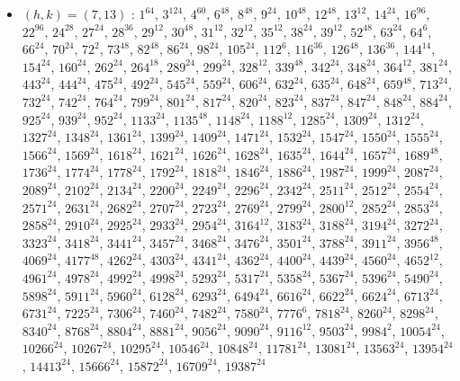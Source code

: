 \begin{itemize}
\item $(h,k)=(7,13)$ : $1^{64}$, $3^{124}$, $4^{60}$, $6^{48}$, $8^{48}$, $9^{24}$, $10^{48}$, $12^{48}$, $13^{12}$, $14^{24}$, $16^{96}$, $22^{96}$, $24^{28}$, $27^{24}$, $28^{36}$, $29^{12}$, $30^{48}$, $31^{12}$, $32^{12}$, $35^{12}$, $38^{24}$, $39^{12}$, $52^{48}$, $63^{24}$, $64^{6}$, $66^{24}$, $70^{24}$, $72^{2}$, $73^{48}$, $82^{48}$, $86^{24}$, $98^{24}$, $105^{24}$, $112^{6}$, $116^{36}$, $126^{48}$, $136^{36}$, $144^{14}$, $154^{24}$, $160^{24}$, $262^{24}$, $264^{18}$, $289^{24}$, $299^{24}$, $328^{12}$, $339^{48}$, $342^{24}$, $348^{24}$, $364^{12}$, $381^{24}$, $443^{24}$, $444^{24}$, $475^{24}$, $492^{24}$, $545^{24}$, $559^{24}$, $606^{24}$, $632^{24}$, $635^{24}$, $648^{24}$, $659^{48}$, $713^{24}$, $732^{24}$, $742^{24}$, $764^{24}$, $799^{24}$, $801^{24}$, $817^{24}$, $820^{24}$, $823^{24}$, $837^{24}$, $847^{24}$, $848^{24}$, $884^{24}$, $925^{24}$, $939^{24}$, $952^{24}$, $1133^{24}$, $1135^{48}$, $1148^{24}$, $1188^{12}$, $1285^{24}$, $1309^{24}$, $1312^{24}$, $1327^{24}$, $1348^{24}$, $1361^{24}$, $1399^{24}$, $1409^{24}$, $1471^{24}$, $1532^{24}$, $1547^{24}$, $1550^{24}$, $1555^{24}$, $1566^{24}$, $1569^{24}$, $1618^{24}$, $1621^{24}$, $1626^{24}$, $1628^{24}$, $1635^{24}$, $1644^{24}$, $1657^{24}$, $1689^{48}$, $1736^{24}$, $1774^{24}$, $1778^{24}$, $1792^{24}$, $1818^{24}$, $1846^{24}$, $1886^{24}$, $1987^{24}$, $1999^{24}$, $2087^{24}$, $2089^{24}$, $2102^{24}$, $2134^{24}$, $2200^{24}$, $2249^{24}$, $2296^{24}$, $2342^{24}$, $2511^{24}$, $2512^{24}$, $2554^{24}$, $2571^{24}$, $2631^{24}$, $2682^{24}$, $2707^{24}$, $2723^{24}$, $2769^{24}$, $2799^{24}$, $2800^{12}$, $2852^{24}$, $2853^{24}$, $2858^{24}$, $2910^{24}$, $2925^{24}$, $2933^{24}$, $2954^{24}$, $3164^{12}$, $3183^{24}$, $3188^{24}$, $3194^{24}$, $3272^{24}$, $3323^{24}$, $3418^{24}$, $3441^{24}$, $3457^{24}$, $3468^{24}$, $3476^{24}$, $3501^{24}$, $3788^{24}$, $3911^{24}$, $3956^{48}$, $4069^{24}$, $4177^{48}$, $4262^{24}$, $4303^{24}$, $4341^{24}$, $4362^{24}$, $4400^{24}$, $4439^{24}$, $4560^{24}$, $4652^{12}$, $4961^{24}$, $4978^{24}$, $4992^{24}$, $4998^{24}$, $5293^{24}$, $5317^{24}$, $5358^{24}$, $5367^{24}$, $5396^{24}$, $5490^{24}$, $5898^{24}$, $5911^{24}$, $5960^{24}$, $6128^{24}$, $6293^{24}$, $6494^{24}$, $6616^{24}$, $6622^{24}$, $6624^{24}$, $6713^{24}$, $6731^{24}$, $7225^{24}$, $7306^{24}$, $7460^{24}$, $7482^{24}$, $7580^{24}$, $7776^{6}$, $7818^{24}$, $8260^{24}$, $8298^{24}$, $8340^{24}$, $8768^{24}$, $8804^{24}$, $8881^{24}$, $9056^{24}$, $9090^{24}$, $9116^{12}$, $9503^{24}$, $9984^{2}$, $10054^{24}$, $10266^{24}$, $10267^{24}$, $10295^{24}$, $10546^{24}$, $10848^{24}$, $11781^{24}$, $13081^{24}$, $13563^{24}$, $13954^{24}$, $14413^{24}$, $15666^{24}$, $15872^{24}$, $16709^{24}$, $19387^{24}$

\end{itemize}
